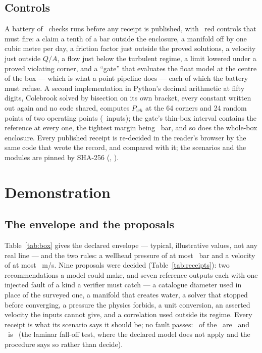 \documentclass[preprint,11pt,authoryear]{elsarticle}
\begin{document}
\subsection{Controls}
A battery of \GChecks\ checks runs before any receipt is published, with \GReds\ red controls that must fire: a claim a tenth of a bar outside the enclosure, a manifold off by one cubic metre per day, a friction factor just outside the proved solutions, a velocity just outside $Q/A$, a flow just below the turbulent regime, a limit lowered under a proved violating corner, and a ``gate'' that evaluates the float model at the centre of the box --- which is what a point pipeline does --- each of which the battery must refuse. A second implementation in Python's decimal arithmetic at fifty digits, Colebrook solved by bisection on its own bracket, every constant written out again and no code shared, computes $P_{wh}$ at the 64 corners and 24 random points of two operating points (\GRefPoints\ inputs); the gate's thin-box interval contains the reference at every one, the tightest margin being \GRefMargin\ bar, and so does the whole-box enclosure. Every published receipt is re-decided in the reader's browser by the same code that wrote the record, and compared with it; the scenarios and the modules are pinned by SHA-256 (\GScenariosSha, \GGateSha).

\section{Demonstration}\label{sec:demo}

\subsection{The envelope and the proposals}
Table~\ref{tab:box} gives the declared envelope --- typical, illustrative values, not any real line --- and the two rules: a wellhead pressure of at most \GRulePwh\ bar and a velocity of at most \GRuleV\ m/s. Nine proposals were decided (Table~\ref{tab:receipts}): two recommendations a model could make, and seven reference outputs each with one injected fault of a kind a verifier must catch --- a catalogue diameter used in place of the surveyed one, a manifold that creates water, a solver that stopped before converging, a pressure the physics forbids, a unit conversion, an asserted velocity the inputs cannot give, and a correlation used outside its regime. Every receipt is what its scenario says it should be; no fault passes: \GFaultsRefuted\ of the \GFaults\ are \vRefuted\ and \GFaultsRefused\ is \vRefused\ (the laminar fall-off test, where the declared model does not apply and the procedure says so rather than decide).
\end{document}
